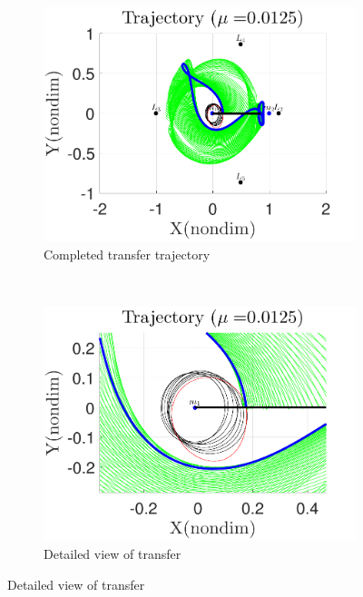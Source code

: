 \documentclass[smallcondensed]{svjour3}
\begin{document}
\begin{figure} 
        \centering 
        \begin{subfigure}[htbp]{0.5\textwidth} 
                \includegraphics[width=\textwidth]{geo_transfer_full} 
                \caption{Completed transfer trajectory} \label{fig:geo_transfer_full} 
        \end{subfigure}~ %
        \begin{subfigure}[htbp]{0.5\textwidth} 
                \includegraphics[width=\textwidth]{geo_transfer_zoom} 
                \caption{Detailed view of transfer} \label{fig:geo_transfer_zoom} 
        \end{subfigure} 
        

\end{figure}
\end{document}
